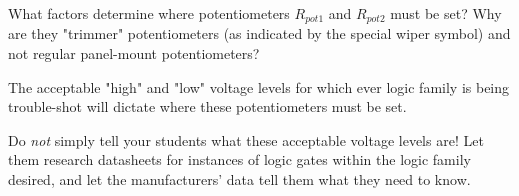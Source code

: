 

What factors determine where potentiometers $R_{pot1}$ and $R_{pot2}$ must be set?  Why are they "trimmer" potentiometers (as indicated by the special wiper symbol) and not regular panel-mount potentiometers?







The acceptable "high" and "low" voltage levels for which ever logic family is being trouble-shot will dictate where these potentiometers must be set.







Do {\it not} simply tell your students what these acceptable voltage levels are!  Let them research datasheets for instances of logic gates within the logic family desired, and let the manufacturers' data tell them what they need to know.



